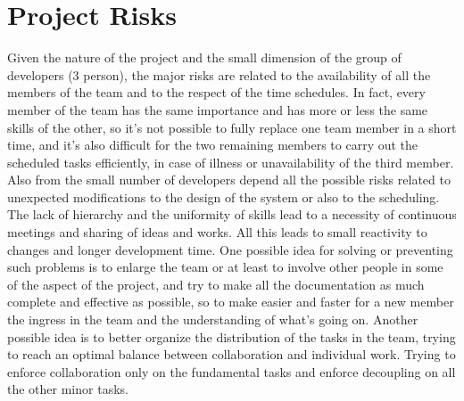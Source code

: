 \chapter{Project Risks} \label{chap5}
Given the nature of the project and the small dimension of the group of developers (3 person), the major risks are related to the availability of all the members of the team and to the respect of the time schedules. In fact, every member of the team has the same importance and has more or less the same skills of the other, so it's not possible to fully replace one team member in a short time, and it's also difficult for the two remaining members to carry out the scheduled tasks efficiently, in case of illness or unavailability of the third member.
Also from the small number of developers depend all the possible risks related to unexpected modifications to the design of the system or also to the scheduling. The lack of hierarchy and the uniformity of skills lead to a necessity of continuous meetings and sharing of ideas and works. All this leads to small reactivity to changes and longer development time.
One possible idea for solving or preventing such problems is to enlarge the team or at least to involve other people in some of the aspect of the project, and try to make all the documentation as much complete and effective as possible, so to make easier and faster for a new member the ingress in the team and the understanding of what's going on.
Another possible idea is to better organize the distribution of the tasks in the team, trying to reach an optimal balance between collaboration and individual work. Trying to enforce collaboration only on the fundamental tasks and enforce decoupling on all the other minor tasks.
